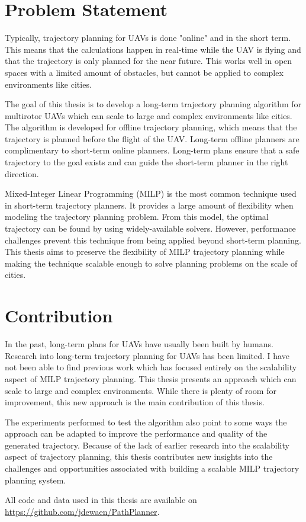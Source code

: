 \section{Problem Statement}
Typically, trajectory planning for UAVs is done "online" and in the short term. This means that the calculations happen in real-time while the UAV is flying and that the trajectory is only planned for the near future. This works well in open spaces with a limited amount of obstacles, but cannot be applied to complex environments like cities.
\par
The goal of this thesis is to develop a long-term trajectory planning algorithm for multirotor UAVs which can scale to large and complex environments like cities. The algorithm is developed for offline trajectory planning, which means that the trajectory is planned before the flight of the UAV. Long-term offline planners are complimentary to short-term online planners. Long-term plans ensure that a safe trajectory to the goal exists and can guide the short-term planner in the right direction.
\par
Mixed-Integer Linear Programming (MILP) is the most common technique used in short-term trajectory planners. It provides a large amount of flexibility when modeling the trajectory planning problem. From this model, the optimal trajectory can be found by using widely-available solvers. However, performance challenges prevent this technique from being applied beyond short-term planning. This thesis aims to preserve the flexibility of MILP trajectory planning while making the technique scalable enough to solve planning problems on the scale of cities.

\section{Contribution}
In the past, long-term plans for UAVs have usually been built by humans. Research into long-term trajectory planning for UAVs has been limited. I have not been able to find previous work which has focused entirely on the scalability aspect of MILP trajectory planning. This thesis presents an approach which can scale to large and complex environments. While there is plenty of room for improvement, this new approach is the main contribution of this thesis.
\par
The experiments performed to test the algorithm also point to some ways the approach can be adapted to improve the performance and quality of the generated trajectory. Because of the lack of earlier research into the scalability aspect of trajectory planning, this thesis contributes new insights into the challenges and opportunities associated with building a scalable MILP trajectory planning system.
\par
All code and data used in this thesis are available on \url{https://github.com/jdewaen/PathPlanner}.

